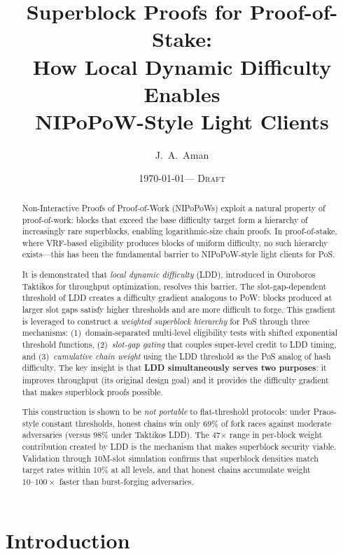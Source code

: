 \documentclass[11pt]{article}
\title{Superblock Proofs for Proof-of-Stake:\\
How Local Dynamic Difficulty Enables\\
NIPoPoW-Style Light Clients}
\author{J.~A.~Aman}
\date{\today \quad --- \quad \textsc{Draft}}
\begin{document}
\maketitle

\begin{abstract}
Non-Interactive Proofs of Proof-of-Work (NIPoPoWs) exploit a natural property of proof-of-work: blocks that exceed the base difficulty target form a hierarchy of increasingly rare superblocks, enabling logarithmic-size chain proofs. In proof-of-stake, where VRF-based eligibility produces blocks of uniform difficulty, no such hierarchy exists---this has been the fundamental barrier to NIPoPoW-style light clients for PoS.

It is demonstrated that \emph{local dynamic difficulty} (LDD), introduced in Ouroboros Taktikos for throughput optimization, resolves this barrier. The slot-gap-dependent threshold of LDD creates a difficulty gradient analogous to PoW: blocks produced at larger slot gaps satisfy higher thresholds and are more difficult to forge. This gradient is leveraged to construct a \emph{weighted superblock hierarchy} for PoS through three mechanisms: (1)~domain-separated multi-level eligibility tests with shifted exponential threshold functions, (2)~\emph{slot-gap gating} that couples super-level credit to LDD timing, and (3)~\emph{cumulative chain weight} using the LDD threshold as the PoS analog of hash difficulty. The key insight is that \textbf{LDD simultaneously serves two purposes}: it improves throughput (its original design goal) and it provides the difficulty gradient that makes superblock proofs possible.

This construction is shown to be \emph{not portable} to flat-threshold protocols: under Praos-style constant thresholds, honest chains win only 69\% of fork races against moderate adversaries (versus 98\% under Taktikos LDD). The 47$\times$ range in per-block weight contribution created by LDD is the mechanism that makes superblock security viable. Validation through 10M-slot simulation confirms that superblock densities match target rates within 10\% at all levels, and that honest chains accumulate weight $10\text{--}100\times$ faster than burst-forging adversaries.
\end{abstract}

\section{Introduction}
\end{document}
